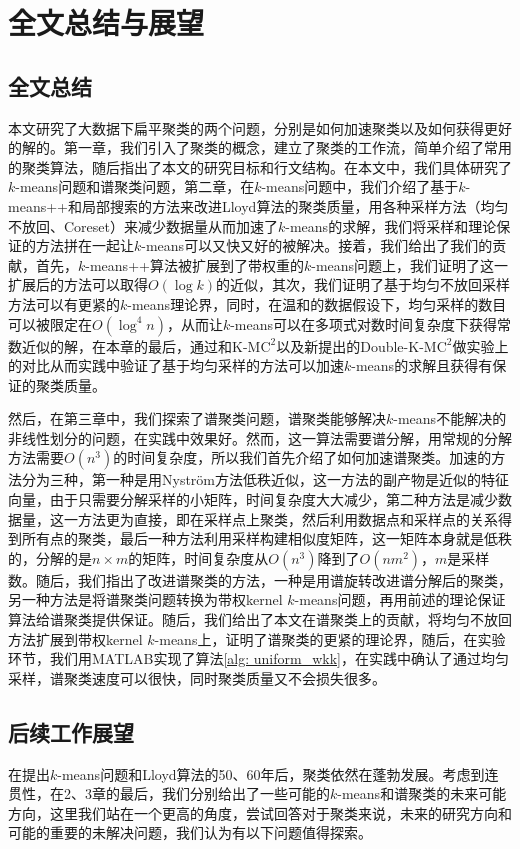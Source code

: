 \chapter{全文总结与展望}

\section{全文总结}
本文研究了大数据下扁平聚类的两个问题，分别是如何加速聚类以及如何获得更好的解的。第一章，我们引入了聚类的概念，建立了聚类的工作流，简单介绍了常用的聚类算法，随后指出了本文的研究目标和行文结构。在本文中，我们具体研究了$k$-means问题和谱聚类问题，第二章，在$k$-means问题中，我们介绍了基于$k$-means++和局部搜索的方法来改进Lloyd算法的聚类质量，用各种采样方法（均匀不放回、Coreset）来减少数据量从而加速了$k$-means的求解，我们将采样和理论保证的方法拼在一起让$k$-means可以又快又好的被解决。接着，我们给出了我们的贡献，首先，$k$-means++算法被扩展到了带权重的$k$-means问题上，我们证明了这一扩展后的方法可以取得$O(\log k)$的近似，其次，我们证明了基于均匀不放回采样方法可以有更紧的$k$-means理论界，同时，在温和的数据假设下，均匀采样的数目可以被限定在$O(\log^4 n)$，从而让$k$-means可以在多项式对数时间复杂度下获得常数近似的解，在本章的最后，通过和K-M$\text{C}^2$以及新提出的Double-K-M$\text{C}^2$做实验上的对比从而实践中验证了基于均匀采样的方法可以加速$k$-means的求解且获得有保证的聚类质量。

然后，在第三章中，我们探索了谱聚类问题，谱聚类能够解决$k$-means不能解决的非线性划分的问题，在实践中效果好。然而，这一算法需要谱分解，用常规的分解方法需要$O(n^3)$的时间复杂度，所以我们首先介绍了如何加速谱聚类。加速的方法分为三种，第一种是用Nyström方法低秩近似，这一方法的副产物是近似的特征向量，由于只需要分解采样的小矩阵，时间复杂度大大减少，第二种方法是减少数据量，这一方法更为直接，即在采样点上聚类，然后利用数据点和采样点的关系得到所有点的聚类，最后一种方法利用采样构建相似度矩阵，这一矩阵本身就是低秩的，分解的是$n\times m$的矩阵，时间复杂度从$O(n^3)$降到了$O(nm^2)$，$m$是采样数。随后，我们指出了改进谱聚类的方法，一种是用谱旋转改进谱分解后的聚类，另一种方法是将谱聚类问题转换为带权kernel $k$-means问题，再用前述的理论保证算法给谱聚类提供保证。随后，我们给出了本文在谱聚类上的贡献，将均匀不放回方法扩展到带权kernel $k$-means上，证明了谱聚类的更紧的理论界，随后，在实验环节，我们用MATLAB实现了算法\ref{alg: uniform_wkk}，在实践中确认了通过均匀采样，谱聚类速度可以很快，同时聚类质量又不会损失很多。

\section{后续工作展望}
在提出$k$-means问题和Lloyd算法的50、60年后，聚类依然在蓬勃发展。考虑到连贯性，在2、3章的最后，我们分别给出了一些可能的$k$-means和谱聚类的未来可能方向，这里我们站在一个更高的角度，尝试回答对于聚类来说，未来的研究方向和可能的重要的未解决问题，我们认为有以下问题值得探索。


